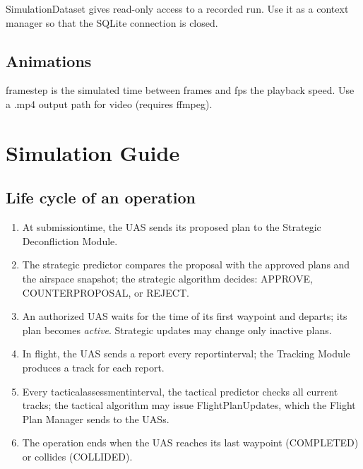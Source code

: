 \documentclass[11pt,a4paper,oneside]{report}
\newcommand{\code}[1]{\textcolor{primary!85!black}{\ttfamily\def\_{\textunderscore\allowbreak}#1}}
\begin{document}
\code{SimulationDataset} gives read-only access to a recorded run. Use it as a
context manager so that the SQLite connection is closed.


\section{Animations}


\code{frame\_step} is the simulated time between frames and \code{fps} the
playback speed. Use a \code{.mp4} output path for video (requires
\code{ffmpeg}).

\chapter{Simulation Guide}

\section{Life cycle of an operation}

\begin{enumerate}[label={\color{accent}\bfseries\arabic*.}]
  \item At \code{submission\_time}, the UAS sends its proposed plan to the
    Strategic Deconfliction Module.
  \item The strategic predictor compares the proposal with the approved plans
    and the airspace snapshot; the strategic algorithm decides:
    \code{APPROVE}, \code{COUNTER\_PROPOSAL}, or \code{REJECT}.
  \item An authorized UAS waits for the time of its first waypoint and
    departs; its plan becomes \emph{active}. Strategic updates may change
    only inactive plans.
  \item In flight, the UAS sends a report every \code{report\_interval}; the
    Tracking Module produces a track for each report.
  \item Every \code{tactical\_assessment\_interval}, the tactical predictor
    checks all current tracks; the tactical algorithm may issue
    \code{FlightPlanUpdate}s, which the Flight Plan Manager sends to the UASs.
  \item The operation ends when the UAS reaches its last waypoint
    (\code{COMPLETED}) or collides (\code{COLLIDED}).
\end{enumerate}
\end{document}
